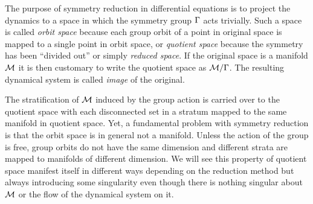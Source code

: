 

The purpose of symmetry reduction in differential equations
is to project the dynamics to a space in which the symmetry
group $\Gamma$ acts trivially. Such a space is called \emph{orbit
 space} because each group orbit of a point in original space
is mapped to a single point in orbit space, or \emph{quotient
space} because the symmetry has been ``divided out'' or
simply \emph{reduced space}. If the original space is a
manifold $\mathcal{M}$ it is then customary to write the quotient
space as $\mathcal{M}/\Gamma$. The resulting dynamical system is
called \emph{image} of the original.


The stratification
of $\mathcal{M}$ induced by the group action is carried over to
the quotient space with each disconnected set in a stratum
mapped to the same manifold in quotient space. Yet, a
fundamental problem with symmetry reduction is that the orbit
space is in general not a manifold. Unless the action of the
group is free, group orbits do not have the same dimension
and different strata are mapped to manifolds of different
dimension. We will see this property of quotient space
manifest itself in different ways depending on the reduction
method but always introducing some singularity even though
there is nothing singular about $\mathcal{M}$ or the flow of the
dynamical system on it.
